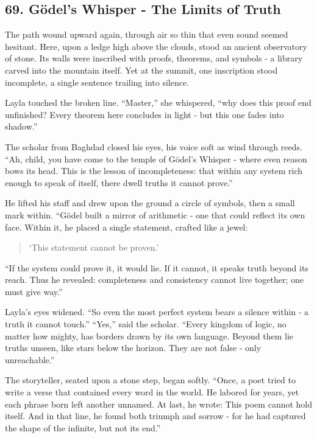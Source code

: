 \documentclass[
  letterpaper,
  DIV=11,
  numbers=noendperiod]{scrreprt}
\begin{document}
\subsection{69. Gödel's Whisper - The Limits of
Truth}\label{guxf6dels-whisper---the-limits-of-truth}

The path wound upward again, through air so thin that even sound seemed
hesitant. Here, upon a ledge high above the clouds, stood an ancient
observatory of stone. Its walls were inscribed with proofs, theorems,
and symbols - a library carved into the mountain itself. Yet at the
summit, one inscription stood incomplete, a single sentence trailing
into silence.

Layla touched the broken line. ``Master,'' she whispered, ``why does
this proof end unfinished? Every theorem here concludes in light - but
this one fades into shadow.''

The scholar from Baghdad closed his eyes, his voice soft as wind through
reeds. ``Ah, child, you have come to the temple of Gödel's Whisper -
where even reason bows its head. This is the lesson of incompleteness:
that within any system rich enough to speak of itself, there dwell
truths it cannot prove.''

He lifted his staff and drew upon the ground a circle of symbols, then a
small mark within. ``Gödel built a mirror of arithmetic - one that could
reflect its own face. Within it, he placed a single statement, crafted
like a jewel:

\begin{quote}
`This statement cannot be proven.'
\end{quote}

``If the system could prove it, it would lie. If it cannot, it speaks
truth beyond its reach. Thus he revealed: completeness and consistency
cannot live together; one must give way.''

Layla's eyes widened. ``So even the most perfect system bears a silence
within - a truth it cannot touch.'' ``Yes,'' said the scholar. ``Every
kingdom of logic, no matter how mighty, has borders drawn by its own
language. Beyond them lie truths unseen, like stars below the horizon.
They are not false - only unreachable.''

The storyteller, seated upon a stone step, began softly. ``Once, a poet
tried to write a verse that contained every word in the world. He
labored for years, yet each phrase born left another unnamed. At last,
he wrote: This poem cannot hold itself. And in that line, he found both
triumph and sorrow - for he had captured the shape of the infinite, but
not its end.''
\end{document}
